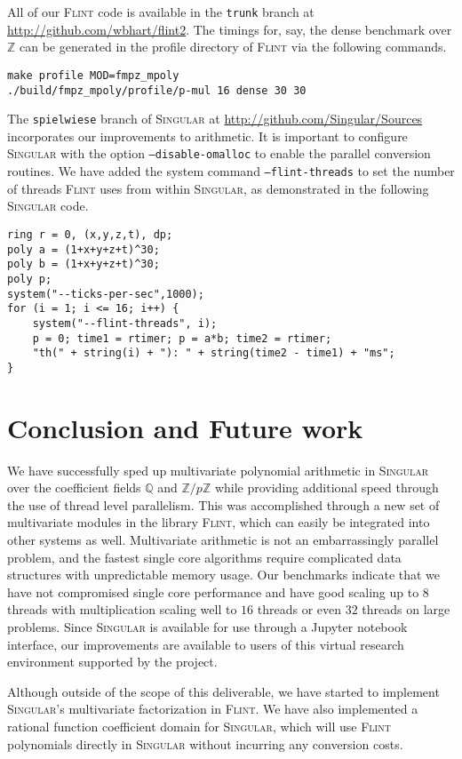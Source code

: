 \documentclass{deliverablereport}
\begin{document}
All of our \textsc{Flint} code is available in the {\tt trunk} branch at \url{http://github.com/wbhart/flint2}. The timings for, say, the dense benchmark over $\mathbb{Z}$ can be generated in the profile directory of \textsc{Flint} via the following commands.
\begin{verbatim}
make profile MOD=fmpz_mpoly
./build/fmpz_mpoly/profile/p-mul 16 dense 30 30
\end{verbatim}

The {\tt spielwiese} branch of \textsc{Singular} at \url{http://github.com/Singular/Sources} incorporates our improvements to arithmetic. It is important to configure \textsc{Singular} with the option {\tt --disable-omalloc} to enable the parallel conversion routines. We have added the system command {\tt --flint-threads} to set the number of threads \textsc{Flint} uses from within \textsc{Singular}, as demonstrated in the following \textsc{Singular} code.
\begin{verbatim}
ring r = 0, (x,y,z,t), dp;
poly a = (1+x+y+z+t)^30;
poly b = (1+x+y+z+t)^30;
poly p;
system("--ticks-per-sec",1000);
for (i = 1; i <= 16; i++) {
    system("--flint-threads", i);
    p = 0; time1 = rtimer; p = a*b; time2 = rtimer;
    "th(" + string(i) + "): " + string(time2 - time1) + "ms";
}
\end{verbatim}


\section{Conclusion and Future work}
We have successfully sped up multivariate polynomial arithmetic in \textsc{Singular} over the coefficient fields $\mathbb{Q}$ and $\mathbb{Z}/p \mathbb{Z}$ while providing additional speed through the use of thread level parallelism. This was accomplished through a new set of multivariate modules in the library \textsc{Flint}, which can easily be integrated into other systems as well. Multivariate arithmetic is not an embarrassingly parallel problem, and the fastest single core algorithms require complicated data structures with unpredictable memory usage. Our benchmarks indicate that we have not compromised single core performance and have good scaling up to $8$ threads with multiplication scaling well to $16$ threads or even $32$ threads on large problems. Since \textsc{Singular} is available for use through a Jupyter notebook interface, our improvements are available to users of this virtual research environment supported by the \ODK project.

Although outside of the scope of this deliverable, we have started to implement \textsc{Singular}'s multivariate factorization in \textsc{Flint}. We have also implemented a rational function coefficient domain for \textsc{Singular}, which will use \textsc{Flint} polynomials directly in \textsc{Singular} without incurring any conversion costs.

\printbibliography
\end{document}
